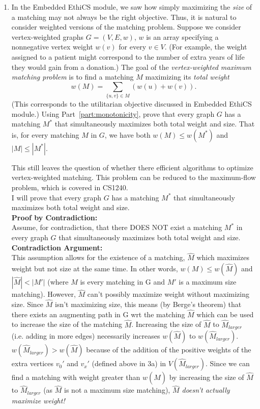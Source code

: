 \documentclass[11pt]{article}
\begin{document}
\begin{enumerate}
\begin{enumerate}
        \item   In the Embedded EthiCS module, we saw how simply maximizing the {\em size} of a matching may not always be the right objective.  Thus, it is natural to consider weighted versions of the matching problem. Suppose 
        we consider vertex-weighted graphs $G = (V,E,w)$, $w$ is an array specifying a nonnegative vertex weight $w(v)$ for every $v\in V$.  (For example, the weight assigned to a patient might correspond to the number of extra years of life they would gain from a donation.)
          The goal of the {\em vertex-weighted maximum matching problem} is to find a matching $M$ maximizing its {\em total weight} $$w(M) = \sum_{\{u,v\}\in M} (w(u)+w(v)).$$
        (This corresponds to the utilitarian objective discussed in Embedded EthiCS module.)
        Using Part~\ref{part:monotonicity}, prove that every graph $G$ has a matching $M^*$ that simultaneously maximizes both total weight and size.  That is, for every matching $M$ in $G$, we have
        both $w(M)\leq w(M^*)$ and $|M|\leq |M^*|$.

        This still leaves the question of whether there efficient algorithms to optimize vertex-weighted matching.  This problem can be reduced to the maximum-flow problem, which is covered in CS1240.\\


        I will prove that every graph $G$ has a matching $M^*$ that simultaneously maximizes both total weight and size. \\

        \textbf{Proof by Contradiction:} \\
        Assume, for contradiction, that there DOES NOT exist a matching $M^*$ in every graph $G$ that simultaneously maximizes both total weight and size. \\

        \textbf{Contradiction Argument:} \\
        This assumption allows for the existence of a matching, $\hat{M}$ which maximizes weight but not size at the same time. In other words, $w(M) \leq w(\hat{M})$ and $|\hat{M}| < |M'|$ (where $M$ is every matching in G and $M'$ is a maximum size matching). However, $\hat{M}$ can't possibly maximize weight without maximizing size. Since $\hat{M}$ isn't maximizing size, this means (by Berge's theorem) that there exists an augmenting path in G wrt the matching $\hat{M}$ which can be used to increase the size of the matching $\hat{M}$. Increasing the size of $\hat{M}$ to $\hat{M}_{larger}$ (i.e. adding in more edges) necessarily increases $w(\hat{M})$ to $w(\hat{M}_{larger})$. $w(\hat{M}_{larger}) > w(\hat{M})$ because of the addition of the positive weights of the extra vertices $v_0'$ and $v_x'$ (defined above in 3a) in $V(\hat{M}_{larger})$. Since we can find a matching with weight greater than $w(\hat{M})$ by increasing the size of $\hat{M}$ to $\hat{M}_{larger}$ (as $\hat{M}$ is not a maximum size matching), \textit{$\hat{M}$ doesn't actually maximize weight!} \\


\end{enumerate}
\end{enumerate}
\end{document}
